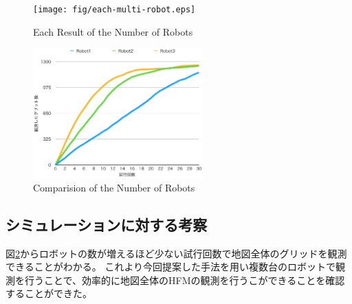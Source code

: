 \documentclass{jsarticle}
\begin{document}
\begin{figure}[tbh]
 \centering
  \texttt{[image: fig/each-multi-robot.eps]}
  \vspace*{-4mm}
  \caption{Each Result of the Number of Robots}
  \label{fig: each-multirobot}
\end{figure}

\begin{figure}[tbh]
 \centering
  \includegraphics[height=50mm]{fig/multi-robot.eps}
  \vspace*{-4mm}
  \caption{Comparision of the Number of Robots}
  \label{fig: multirobot}
\end{figure}


\subsection{シミュレーションに対する考察}
図\ref{fig: multirobot}からロボットの数が増えるほど少ない試行回数で地図全体のグリッドを観測できることがわかる。
これより今回提案した手法を用い複数台のロボットで観測を行うことで、効率的に地図全体のHFMの観測を行うこができることを確認することができた。
\end{document}
